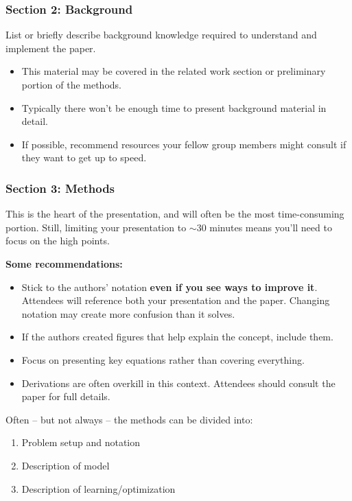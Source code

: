 \documentclass[10pt, aspectratio=169]{beamer}
\begin{document}
\begin{frame}
\frametitle{Section 2: Background}
List or briefly describe background knowledge required to understand and implement the paper.

\vspace{2em}
\begin{itemize}
    \item This material may be covered in the related work section or preliminary portion of the methods.
    \item Typically there won't be enough time to present background material in detail.
    \item If possible, recommend resources your fellow group members might consult if they want to get up to speed.
\end{itemize}
\end{frame}

\begin{frame}
\frametitle{Section 3: Methods}
This is the heart of the presentation, and will often be the most time-consuming portion. Still, limiting your presentation to $\sim$30 minutes means you'll need to focus on the high points.

\vspace{1em}
\textbf{Some recommendations:}
\begin{itemize}
    \item Stick to the authors' notation \textbf{even if you see ways to improve it}. Attendees will reference both your presentation and the paper. Changing notation may create more confusion than it solves.
    \item If the authors created figures that help explain the concept, include them.
    \item Focus on presenting key equations rather than covering everything.
    \item Derivations are often overkill in this context. Attendees should consult the paper for full details.
\end{itemize}

\vspace{1em}
Often -- but not always -- the methods can be divided into:
\begin{enumerate}
    \item Problem setup and notation
    \item Description of model
    \item Description of learning/optimization
\end{enumerate}
\end{frame}
\end{document}
